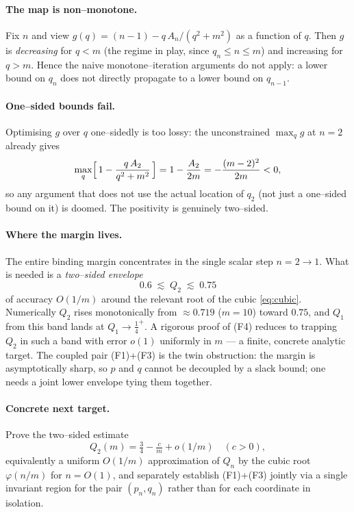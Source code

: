 \documentclass[11pt]{article}
\theoremstyle{definition}
\begin{document}
\paragraph{The map is non--monotone.}
Fix $n$ and view $g(q)=(n-1)-q\,A_n/(q^2+m^2)$ as a function of $q$. Then $g$ is
\emph{decreasing} for $q<m$ (the regime in play, since $q_n\le n\le m$) and
increasing for $q>m$. Hence the naive monotone--iteration arguments do not apply:
a lower bound on $q_n$ does not directly propagate to a lower bound on $q_{n-1}$.

\paragraph{One--sided bounds fail.}
Optimising $g$ over $q$ one--sidedly is too lossy: the unconstrained
$\max_q g$ at $n=2$ already gives
\[
  \max_q\Bigl[\,1-\frac{q\,A_2}{q^2+m^2}\,\Bigr]
  = 1-\frac{A_2}{2m}
  = -\frac{(m-2)^2}{2m} < 0 ,
\]
so any argument that does not use the actual location of $q_2$ (not just a
one--sided bound on it) is doomed. The positivity is genuinely two--sided.

\paragraph{Where the margin lives.}
The entire binding margin concentrates in the single scalar step $n=2\to1$.
What is needed is a \emph{two--sided envelope}
\[
  0.6 \;\lesssim\; Q_2 \;\lesssim\; 0.75
\]
of accuracy $O(1/m)$ around the relevant root of the cubic \eqref{eq:cubic}.
Numerically $Q_2$ rises monotonically from $\approx0.719$ ($m=10$) toward
$0.75$, and $Q_1$ from this band lands at $Q_1\to\tfrac14^+$. A rigorous proof of
(F4) reduces to trapping $Q_2$ in such a band with error $o(1)$ uniformly in $m$
--- a finite, concrete analytic target. The coupled pair (F1)+(F3) is the twin
obstruction: the margin is asymptotically sharp, so $p$ and $q$ cannot be
decoupled by a slack bound; one needs a joint lower envelope tying them together.

\paragraph{Concrete next target.} Prove the two--sided estimate
\[
  Q_2(m) = \tfrac34 - \tfrac{c}{m} + o(1/m)\quad(c>0),
\]
equivalently a uniform $O(1/m)$ approximation of $Q_n$ by the cubic root
$\varphi(n/m)$ for $n=O(1)$, and separately establish (F1)+(F3) jointly via a
single invariant region for the pair $(p_n,q_n)$ rather than for each coordinate
in isolation.
\end{document}
